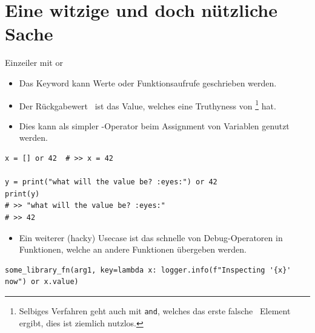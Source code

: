 \documentclass[12pt, aspectratio=169, usepdftitle=false]{beamer}
\newcommand{\pp}[1]{\lpl{#1}}
\begin{document}
\section{Eine witzige und doch nützliche Sache}
\begin{frame}[fragile]{Einzeiler mit \glqq or\grqq}
	\begin{itemize}
		\item Das Keyword \pp{or} kann  Werte oder Funktionsaufrufe geschrieben werden.
		
		\pause
		
		\item Der \glqq Rückgabewert\grqq~ ist das  Value, welches eine Truthyness von \pp{True}\footnote{Selbiges Verfahren geht auch mit \texttt{and}, welches das erste \glqq falsche\grqq~ Element ergibt, dies ist ziemlich nutzlos.} hat.
		
		\pause
		
		\item Dies kann als simpler -Operator beim Assignment von Variablen genutzt werden.
	\end{itemize}
	\begin{lstlisting}[language=pytiny]
x = [] or 42  # >> x = 42

y = print("what will the value be? :eyes:") or 42
print(y)
# >> "what will the value be? :eyes:"
# >> 42
	\end{lstlisting}
	
	\pause
	
	\begin{itemize}
		\item Ein weiterer (hacky) Usecase ist das schnelle  von Debug-Operatoren in Funktionen, welche an andere Funktionen übergeben werden.
	\end{itemize}
	\begin{lstlisting}[language=pytiny]
some_library_fn(arg1, key=lambda x: logger.info(f"Inspecting '{x}' now") or x.value)
	\end{lstlisting}
\end{frame}


\framecardfragen
\end{document}
